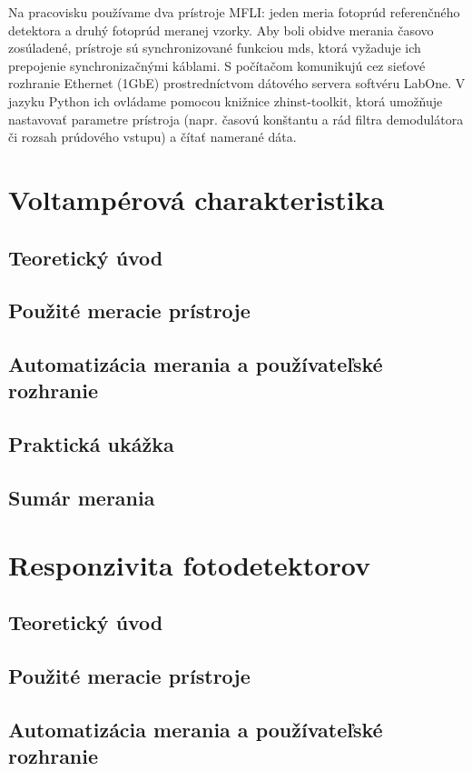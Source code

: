 \documentclass[12pt,a4paper]{article}
\begin{document}
Na pracovisku používame dva prístroje MFLI: jeden meria fotoprúd referenčného detektora a druhý fotoprúd meranej vzorky. Aby boli obidve merania časovo zosúladené, prístroje sú synchronizované funkciou \ac{mds}, ktorá vyžaduje ich prepojenie synchronizačnými káblami. S počítačom komunikujú cez sieťové rozhranie Ethernet (1GbE) prostredníctvom dátového servera softvéru LabOne. V jazyku Python ich ovládame pomocou knižnice zhinst-toolkit, ktorá umožňuje nastavovať parametre prístroja (napr. časovú konštantu a rád filtra demodulátora či rozsah prúdového vstupu) a čítať namerané dáta.

\newpage
\section{Voltampérová charakteristika}
\subsection{Teoretický úvod}
\subsection{Použité meracie prístroje}
\subsection{Automatizácia merania a používateľské rozhranie}
\subsection{Praktická ukážka}
\subsection{Sumár merania}

\newpage
\section{Responzivita fotodetektorov}
\subsection{Teoretický úvod}
\subsection{Použité meracie prístroje}
\subsection{Automatizácia merania a používateľské rozhranie}
\end{document}
